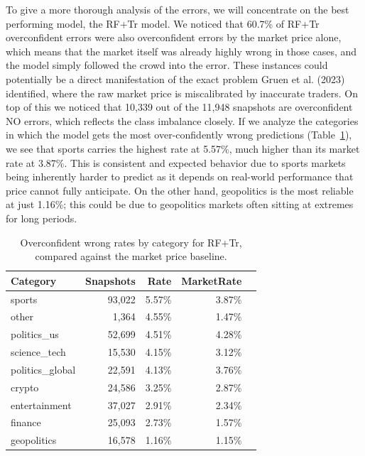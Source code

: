 \documentclass[11pt,twocolumn]{article}
\begin{document}
To give a more thorough analysis of the errors, we will concentrate on the best performing model, the RF+Tr model. We noticed that 60.7\% of RF+Tr overconfident errors were also overconfident errors by the market price alone, which means that the market itself was already highly wrong in those cases, and the model simply followed the crowd into the error. These instances could potentially be a direct manifestation of the exact problem Gruen et al. (2023) identified, where the raw market price is miscalibrated by inaccurate traders. On top of this we noticed that 10,339 out of the 11,948 snapshots are overconfident NO errors, which reflects the class imbalance closely. If we analyze the categories in which the model gets the most over-confidently wrong predictions (Table~\ref{tab:oc_by_category}), we see that sports carries the highest rate at 5.57\%, much higher than its market rate at 3.87\%. This is consistent and expected behavior due to sports markets being inherently harder to predict as it depends on real-world performance that price cannot fully anticipate. On the other hand, geopolitics is the most reliable at just 1.16\%; this could be due to geopolitics markets often sitting at extremes for long periods.

\begin{table}[h]
\centering
\footnotesize
\begin{tabular}{lrrrr}
\toprule
\textbf{Category} & \textbf{Snapshots} & \textbf{Rate} & \textbf{MarketRate} \\
\midrule
sports           & 93,022 & 5.57\% & 3.87\% \\
other            & 1,364  & 4.55\% & 1.47\% \\
politics\_us     & 52,699 & 4.51\% & 4.28\% \\
science\_tech    & 15,530 & 4.15\% & 3.12\% \\
politics\_global & 22,591 & 4.13\% & 3.76\% \\
crypto           & 24,586 & 3.25\% & 2.87\% \\
entertainment    & 37,027 & 2.91\% & 2.34\% \\
finance          & 25,093 & 2.73\% & 1.57\% \\
geopolitics      & 16,578 & 1.16\% & 1.15\% \\
\bottomrule
\end{tabular}
\caption{Overconfident wrong rates by category for RF+Tr, compared against the market price baseline.}
\label{tab:oc_by_category}
\end{table}
\end{document}
